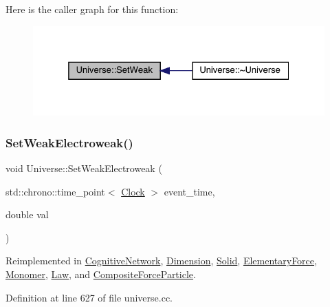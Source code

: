 Here is the caller graph for this function\+:
\nopagebreak
\begin{figure}[H]
\begin{center}
\leavevmode
\includegraphics[width=325pt]{class_universe_a0f5cd04081b41ee931c0557dc397f6fb_icgraph}
\end{center}
\end{figure}
\mbox{\label{class_universe_a2d3d642bfdc863248e93535832fa4b00}} 
\subsubsection{\texorpdfstring{Set\+Weak\+Electroweak()}{SetWeakElectroweak()}}
{\footnotesize\ttfamily void Universe\+::\+Set\+Weak\+Electroweak (\begin{DoxyParamCaption}\item[{std\+::chrono\+::time\+\_\+point$<$ \hyperlink{universe_8h_a0ef8d951d1ca5ab3cfaf7ab4c7a6fd80}{Clock} $>$}]{event\+\_\+time,  }\item[{double}]{val }\end{DoxyParamCaption})\hspace{0.3cm}{\ttfamily [virtual]}}



Reimplemented in \hyperlink{class_cognitive_network_a116f6818986a622e4a318857859e2495}{Cognitive\+Network}, \hyperlink{class_dimension_a1d2accef9e6adf747f5cc143ae4527c9}{Dimension}, \hyperlink{class_solid_adb34befc66f8c681f3a85c44e0d00e3a}{Solid}, \hyperlink{class_elementary_force_a38d4f86f18a9f84a4198ee43bc90f6b4}{Elementary\+Force}, \hyperlink{class_monomer_ab887d7cfd2ecb557efb3ace59852019c}{Monomer}, \hyperlink{class_law_a65e5e757041c1e72bb046eccbb6d66db}{Law}, and \hyperlink{class_composite_force_particle_a73a3792ae1c334e74f945fea56083f0b}{Composite\+Force\+Particle}.



Definition at line 627 of file universe.\+cc.

